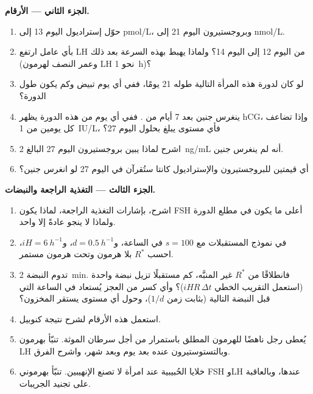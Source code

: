 \begin{problem}
\medskip
\noindent\textbf{الجزء الثاني --- الأرقام.}
\begin{enumerate}[resume]
  \item حوّل إستراديول اليوم 13 إلى \unit{pmol/L}، وبروجستيرون
        اليوم 21 إلى \unit{nmol/L}.
  \item بأي عامل ارتفع LH من اليوم 12 إلى اليوم 14؟ ولماذا
        يهبط بهذه السرعة بعد ذلك (وعمر النصف لهرمون LH نحو
        \qty{1}{h})؟
  \item لو كان لدورة هذه المرأة التالية  طوله 21 يومًا،
        ففي أي يوم تبيض وكم يكون طول الدورة؟
  \item ينغرس جنين بعد 7 أيام من . ففي أي يوم من هذه
        الدورة يظهر hCG، وإذا تضاعف كل يومين
        من \qty{1}{IU/L}، فأي مستوى يبلغ بحلول اليوم 27؟
  \item اشرح لماذا يبين بروجستيرون اليوم 27 البالغ \qty{2}{ng/mL}
        أنه لم ينغرس جنين.
  \item أي قيمتين للبروجستيرون والإستراديول كانتا ستُقرآن في
        اليوم 27 لو انغرس جنين؟
\end{enumerate}

\medskip
\noindent\textbf{الجزء الثالث --- التغذية الراجعة والنبضات.}
\begin{enumerate}[resume]
  \item اشرح، بإشارات التغذية الراجعة، لماذا يكون FSH أعلى ما
        يكون في مطلع الدورة ولماذا لا ينجو عادةً إلا 
        واحد.
  \item في نموذج المستقبلات مع $s = 100$ في الساعة، و$d =
        \qty{0.5}{h^{-1}}$، و$iH = \qty{6}{h^{-1}}$، احسب $R^*$
        بلا هرمون وتحت هرمون مستمر.
  \item تدوم النبضة \qty{2}{min}. فانطلاقًا من $R^*$ غير
        المنبَّه، كم مستقبلًا تزيل نبضة واحدة (استعمل
        التقريب الخطي $iHR\,\Delta t$)؟ وأي كسر من
        العجز يُستعاد في الساعة التي قبل النبضة التالية
        (بثابت زمن $1/d$)، وحول أي مستوى يستقر
        المخزون؟
  \item استعمل هذه الأرقام لشرح نتيجة كنوبيل.
  \item يُعطى رجل ناهضًا للهرمون المطلق باستمرار من أجل سرطان
        الموثة. تنبّأ بهرمون LH وبالتستوستيرون عنده بعد يوم
        وبعد شهر، واشرح الفرق.
  \item خلايا الحُبيبية عند امرأة لا تصنع الإنهيبين. تنبّأ
        بهرموني FSH وLH عندها، وبالعاقبة على تجنيد الجريبات.
\end{enumerate}


\end{problem}
